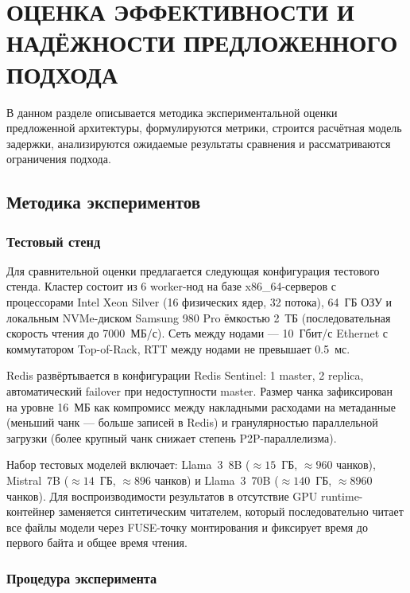\section{ОЦЕНКА ЭФФЕКТИВНОСТИ И НАДЁЖНОСТИ ПРЕДЛОЖЕННОГО ПОДХОДА}

В данном разделе описывается методика экспериментальной оценки предложенной архитектуры, формулируются метрики, строится расчётная модель задержки, анализируются ожидаемые результаты сравнения и рассматриваются ограничения подхода.

\subsection{Методика экспериментов}

\subsubsection*{Тестовый стенд}

Для сравнительной оценки предлагается следующая конфигурация тестового стенда. Кластер состоит из 6 worker-нод на базе x86\_64-серверов с процессорами Intel Xeon Silver (16 физических ядер, 32 потока), 64~ГБ ОЗУ и локальным NVMe-диском Samsung 980 Pro ёмкостью 2~ТБ (последовательная скорость чтения до 7000~МБ/с). Сеть между нодами --- 10~Гбит/с Ethernet с коммутатором Top-of-Rack, RTT между нодами не превышает 0.5~мс.

Redis развёртывается в конфигурации Redis Sentinel: 1 master, 2 replica, автоматический failover при недоступности master. Размер чанка зафиксирован на уровне 16~МБ как компромисс между накладными расходами на метаданные (меньший чанк --- больше записей в Redis) и гранулярностью параллельной загрузки (более крупный чанк снижает степень P2P-параллелизма).

Набор тестовых моделей включает: Llama~3~8B ($\approx 15$~ГБ, $\approx 960$ чанков), Mistral~7B ($\approx 14$~ГБ, $\approx 896$ чанков) и Llama~3~70B ($\approx 140$~ГБ, $\approx 8960$ чанков). Для воспроизводимости результатов в отсутствие GPU runtime-контейнер заменяется синтетическим читателем, который последовательно читает все файлы модели через FUSE-точку монтирования и фиксирует время до первого байта и общее время чтения.

\subsubsection*{Процедура эксперимента}

